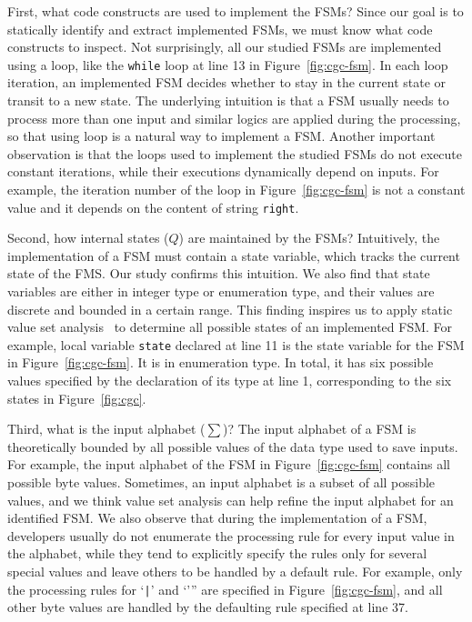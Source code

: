 First, what code constructs are used to implement the FSMs?
Since our goal is to statically identify and extract implemented FSMs, 
we must know what code constructs to inspect. 
Not surprisingly, all our studied FSMs are implemented using a loop, 
like the \texttt{while} loop at line 13 in Figure~\ref{fig:cgc-fsm}.  
In each loop iteration, an implemented FSM 
decides whether to stay in the current state or transit to a new state. 
The underlying intuition is that a FSM usually needs to process 
more than one input and similar logics are applied during the processing, 
so that using loop is a natural way to implement a FSM. 
Another important observation is that 
the loops used to implement the studied FSMs do not execute constant iterations,
while their executions dynamically depend on inputs. 
For example, the iteration number of the loop in Figure~\ref{fig:cgc-fsm}
is not a constant value and it depends on the content of string \texttt{right}.

Second, how internal states ($Q$) are maintained by the FSMs?
Intuitively, the implementation of a FSM must contain a state variable, 
which tracks the current state of the FMS.
Our study confirms this intuition. 
We also find that state variables are either in integer type or enumeration type,
and their values are discrete and bounded in a certain range. 
This finding inspires us to apply static value set analysis~\cite{DEEPVSA,VSA} 
to determine all possible states of an implemented FSM.
For example, local variable \texttt{state} declared at line 11
is the state variable for the FSM in Figure~\ref{fig:cgc-fsm}.
It is in enumeration type.
In total, it has six possible values specified by the declaration of 
its type at line 1, corresponding to the six states in Figure~\ref{fig:cgc}.

Third, what is the input alphabet ($\sum$)? 
The input alphabet of a FSM is theoretically bounded by all possible values 
of the data type used to save inputs. 
For example, the input alphabet of the FSM 
in Figure~\ref{fig:cgc-fsm} 
contains all possible byte values.
Sometimes, an input alphabet is a subset of all possible values, 
and we think value set analysis can help refine the input alphabet for an 
identified FSM.
We also observe that during the implementation of a FSM, 
developers usually do not enumerate the processing rule for every 
input value in the alphabet,
while they tend to explicitly specify the rules only for several special values
and leave others to be handled by a default rule. 
For example, only the processing rules for `\verb/|/' and `''' 
are specified in Figure~\ref{fig:cgc-fsm}, 
and all other byte values are handled by 
the defaulting rule specified at line 37. 


